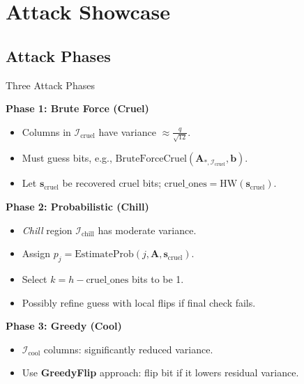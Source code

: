 \documentclass{beamer}
\begin{document}
\section{Attack Showcase}

\subsection*{Attack Phases}
\begin{frame}{Three Attack Phases}

\textbf{Phase 1: Brute Force (Cruel)}
\begin{itemize}
  \item Columns in $\mathcal{I}_{\mathrm{cruel}}$ have variance $\approx \frac{q}{\sqrt{12}}$.
  \item Must guess bits, e.g., $\mathrm{BruteForceCruel}(\mathbf{A}_{*, \mathcal{I}_{\mathrm{cruel}}}, \mathbf{b})$.
  \item Let $\mathbf{s}_{\mathrm{cruel}}$ be recovered cruel bits; 
        $\mathrm{cruel\_ones} = \mathrm{HW}(\mathbf{s}_{\mathrm{cruel}})$.
\end{itemize}

\textbf{Phase 2: Probabilistic (Chill)}
\begin{itemize}
  \item \emph{Chill} region $\mathcal{I}_{\mathrm{chill}}$ has moderate variance.
  \item Assign $p_j = \mathrm{EstimateProb}(j,\mathbf{A},\mathbf{s}_{\mathrm{cruel}})$. 
  \item Select $k = h - \mathrm{cruel\_ones}$ bits to be 1.
  \item Possibly refine guess with local flips if final check fails.
\end{itemize}

\textbf{Phase 3: Greedy (Cool)}
\begin{itemize}
  \item $\mathcal{I}_{\mathrm{cool}}$ columns: significantly reduced variance.
  \item Use \textbf{GreedyFlip} approach: flip bit if it lowers residual variance.
\end{itemize}
\end{frame}
\end{document}
